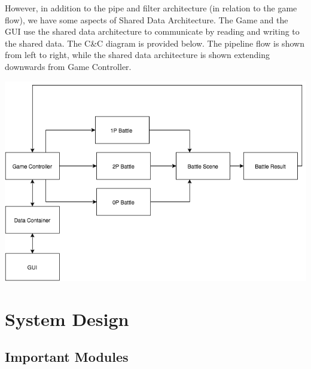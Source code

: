 \documentclass{scrreprt}
\begin{document}
	However, in addition to the pipe and filter architecture (in relation to the game flow), we have some aspects of Shared Data Architecture. The Game and the GUI use the shared data architecture to communicate by reading and writing to the shared data. The C\&C diagram is provided below. The pipeline flow is shown from left to right, while the shared data architecture is shown extending downwards from Game Controller. 
	
	\includegraphics[scale=0.75]{C&C.png}

\section{System Design}
\subsection{Important Modules}
\end{document}
